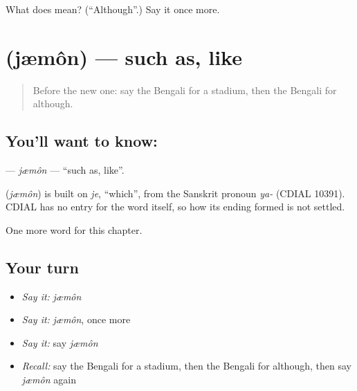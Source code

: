 \begin{tcolorbox}[breakable,colback=teal!4,colframe=teal!35!black,title={Before you move on}]
What does  mean? (\textquotedblleft{}Although\textquotedblright{}.) Say it once more.
\end{tcolorbox}
\section[\texorpdfstring{\bn{যেমন} (jæmôn)}{যেমন (jæmôn)}]{ (jæmôn) — such as, like}

\label{lesson:BN-C218-jmon}



\begin{quote}
Before the new one: say the Bengali for a stadium, then the Bengali for although.
\end{quote}

\subsection*{You'll want to know: }
\textbf{} — \emph{jæmôn} — \textquotedblleft{}such as, like\textquotedblright{}.

\begin{cousinweb}
\textbf{} (\emph{jæmôn}) is built on \emph{je}, \textquotedblleft{}which\textquotedblright{}, from the Sanskrit pronoun \emph{ya-} (CDIAL 10391). CDIAL has no entry for the word itself, so how its ending formed is not settled.
\end{cousinweb}

\begin{grammarlens}[title={What you've built}]
One more word for this chapter.
\end{grammarlens}

\subsection*{Your turn}
\begin{itemize}
\raggedright
  \item \emph{Say it:} \emph{jæmôn}
  \item \emph{Say it:} \emph{jæmôn}, once more
  \item \emph{Say it:} say \emph{jæmôn}
  \item \emph{Recall:} say the Bengali for a stadium, then the Bengali for although, then say \emph{jæmôn} again
\end{itemize}


